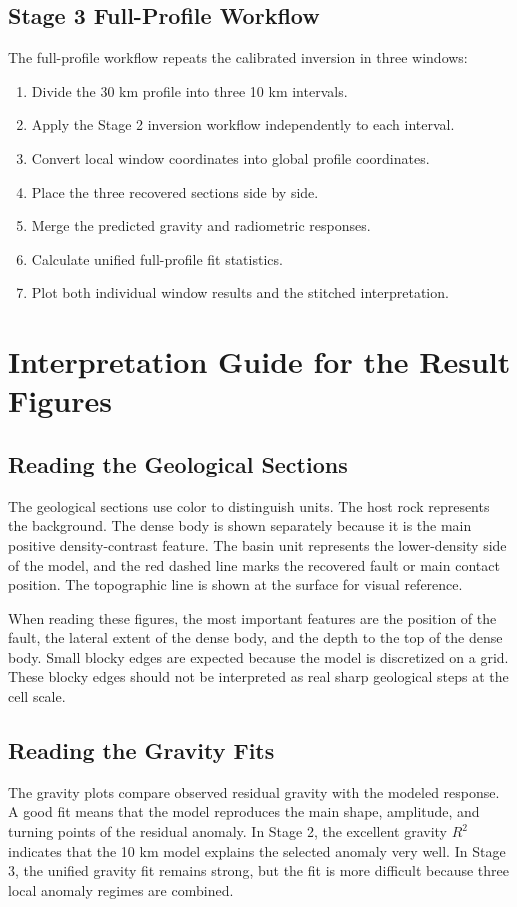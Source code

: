 \documentclass[12pt,a4paper]{article}
\begin{document}
\subsection{Stage 3 Full-Profile Workflow}
The full-profile workflow repeats the calibrated inversion in three windows:
\begin{enumerate}
    \item Divide the 30 km profile into three 10 km intervals.
    \item Apply the Stage 2 inversion workflow independently to each interval.
    \item Convert local window coordinates into global profile coordinates.
    \item Place the three recovered sections side by side.
    \item Merge the predicted gravity and radiometric responses.
    \item Calculate unified full-profile fit statistics.
    \item Plot both individual window results and the stitched interpretation.
\end{enumerate}

\section{Interpretation Guide for the Result Figures}
\subsection{Reading the Geological Sections}
The geological sections use color to distinguish units. The host rock represents the background. The dense body is shown separately because it is the main positive density-contrast feature. The basin unit represents the lower-density side of the model, and the red dashed line marks the recovered fault or main contact position. The topographic line is shown at the surface for visual reference.

When reading these figures, the most important features are the position of the fault, the lateral extent of the dense body, and the depth to the top of the dense body. Small blocky edges are expected because the model is discretized on a grid. These blocky edges should not be interpreted as real sharp geological steps at the cell scale.

\subsection{Reading the Gravity Fits}
The gravity plots compare observed residual gravity with the modeled response. A good fit means that the model reproduces the main shape, amplitude, and turning points of the residual anomaly. In Stage 2, the excellent gravity $R^2$ indicates that the 10 km model explains the selected anomaly very well. In Stage 3, the unified gravity fit remains strong, but the fit is more difficult because three local anomaly regimes are combined.
\end{document}
